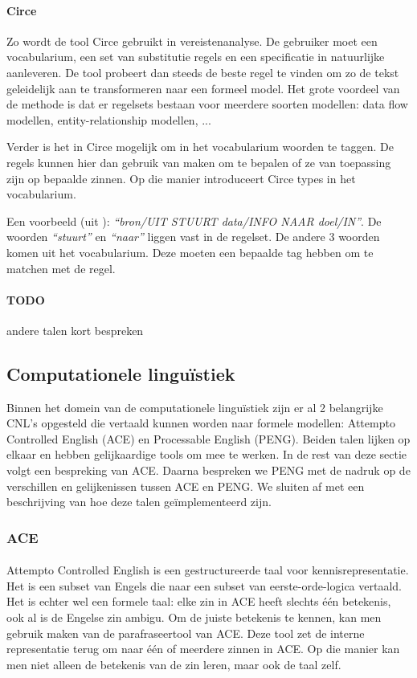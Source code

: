 \documentclass[]{article}
\theoremstyle{definition}
\newcommand{\example}[1]{\textit{``#1''}}
\begin{document}
\paragraph{Circe} Zo wordt de tool Circe\cite{Ambriola1997} gebruikt in vereistenanalyse. De gebruiker moet een vocabularium, een set van substitutie regels en een specificatie in natuurlijke aanleveren. De tool probeert dan steeds de beste regel te vinden om zo de tekst geleidelijk aan te transformeren naar een formeel model. Het grote voordeel van de methode is dat er regelsets bestaan voor meerdere soorten modellen: data flow modellen, entity-relationship modellen, ...

Verder is het in Circe mogelijk om in het vocabularium woorden te taggen. De regels kunnen hier dan gebruik van maken om te bepalen of ze van toepassing zijn op bepaalde zinnen. Op die manier introduceert Circe types in het vocabularium.

Een voorbeeld (uit \cite{Ambriola1997}): \example{bron/UIT STUURT data/INFO NAAR doel/IN}. De woorden \example{stuurt} en \example{naar} liggen vast in de regelset. De andere 3 woorden komen uit het vocabularium. Deze moeten een bepaalde tag hebben om te matchen met de regel. 

\paragraph{TODO} andere talen kort bespreken

\subsection{Computationele linguïstiek} Binnen het domein van de computationele linguïstiek zijn er al 2 belangrijke CNL's opgesteld die vertaald kunnen worden naar formele modellen: Attempto Controlled English (ACE) en Processable English (PENG). Beiden talen lijken op elkaar en hebben gelijkaardige tools om mee te werken. In de rest van deze sectie volgt een bespreking van ACE. Daarna bespreken we PENG met de nadruk op de verschillen en gelijkenissen tussen ACE en PENG. We sluiten af met een beschrijving van hoe deze talen geïmplementeerd zijn.

\subsubsection{ACE}
\paragraph{} Attempto Controlled English\cite{Fuchs2008} is een gestructureerde taal voor kennisrepresentatie. Het is een subset van Engels die naar een subset van eerste-orde-logica vertaald. Het is echter wel een formele taal: elke zin in ACE heeft slechts één betekenis, ook al is de Engelse zin ambigu. Om de juiste betekenis te kennen, kan men gebruik maken van de parafraseertool van ACE. Deze tool zet de interne representatie terug om naar één of meerdere zinnen in ACE. Op die manier kan men niet alleen de betekenis van de zin leren, maar ook de taal zelf.
\end{document}
